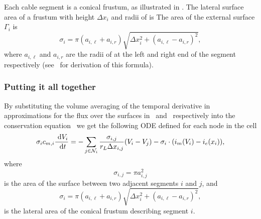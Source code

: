 Each cable segment is a conical frustum, as illustrated in .
The lateral surface area of a frustum with height $\Delta x_i$ and radii of  is
The area of the external surface $\Gamma_{i}$ is
\begin{equation}
    \sigma_i = \pi (a_{i,\ell} + a_{i,r}) \sqrt{\Delta x_i^2 + (a_{i,\ell} - a_{i,r})^2},
    \label{eq:cv_volume}
\end{equation}
where $a_{i,\ell}$ and $a_{i,r}$ are the radii of at the left and right end of the segment respectively (see~ for derivation of this formula).
\subsubsection{Putting it all together}
By substituting the volume averaging of the temporal derivative in~ approximations for the flux over the surfaces in~ and~ respectively into the conservation equation~ we get the following ODE defined for each node in the cell
\begin{equation}
    \sigma_i c_{m,i} \frac{~\text{d}{V_i}}{~\text{d}{t}}
       = -\sum_{j\in\mathcal{N}_i} {\frac{\sigma_{i,j}}{r_L \Delta x_{i,j}} (V_i-V_j)} - \sigma_i\cdot(i_m(V_i) - i_e(x_i)),
    \label{eq:ode}
\end{equation}
where
\begin{equation}
    \sigma_{i,j} = \pi a_{i,j}^2
    \label{eq:sigma_ij}
\end{equation}
is the area of the surface between two adjacent segments $i$ and $j$, and
\begin{equation}
    \sigma_{i}   = \pi(a_{i,\ell} + a_{i,r}) \sqrt{\Delta x_i^2 + (a_{i,\ell} - a_{i,r})^2},
    \label{eq:sigma_i}
\end{equation}
is the lateral area of the conical frustum describing segment $i$.

